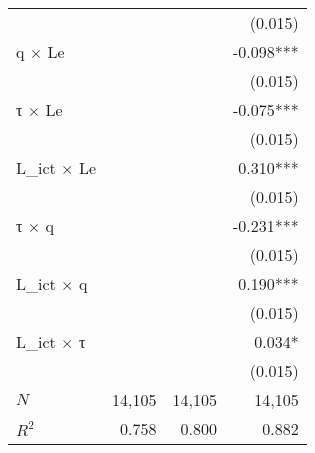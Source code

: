 \begin{tabular}{lrrr}
                       &            &            &    (0.015) \\ 
q $\times$ Le          &            &            &  -0.098*** \\ 
                       &            &            &    (0.015) \\ 
τ $\times$ Le          &            &            &  -0.075*** \\ 
                       &            &            &    (0.015) \\ 
L\_ict $\times$ Le     &            &            &   0.310*** \\ 
                       &            &            &    (0.015) \\ 
τ $\times$ q           &            &            &  -0.231*** \\ 
                       &            &            &    (0.015) \\ 
L\_ict $\times$ q      &            &            &   0.190*** \\ 
                       &            &            &    (0.015) \\ 
L\_ict $\times$ τ      &            &            &     0.034* \\ 
                       &            &            &    (0.015) \\ 
\midrule
$N$                    &     14,105 &     14,105 &     14,105 \\ 
$R^2$                  &      0.758 &      0.800 &      0.882 \\ 
\bottomrule
\end{tabular}
